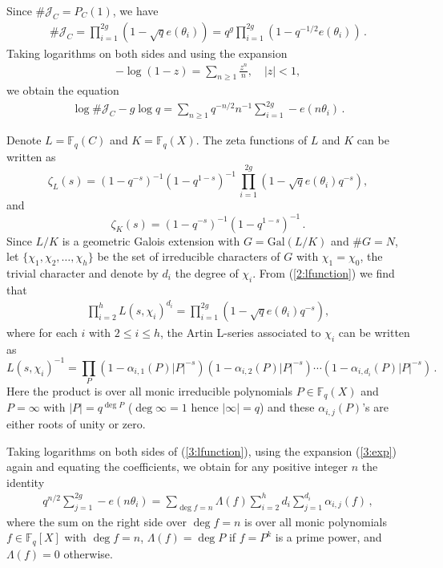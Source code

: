 \documentclass[12pt]{amsart}
\theoremstyle{plain}
\newcommand{\F}{{\mathbb F}_q}
\newcommand{\J}{\mathcal J}
\begin{document}
Since $\#\J_C=P_C(1)$, we have
\begin{eqnarray*}  \# \J_C=\prod_{i=1}^{2g} \left(1-\sqrt{q}e(\theta_i)\right) =q^g \prod_{i=1}^{2g} \left(1-q^{-1/2}e(\theta_i) \right)\,.\end{eqnarray*}
Taking logarithms on both sides and using the expansion
\begin{eqnarray} \label{3:exp}-\log (1-z)=\sum_{n \ge 1} \frac{z^n}{n}, \quad |z|<1,\end{eqnarray}
we obtain the equation
\begin{eqnarray} \label{3:log}
\log \#\J_C-g \log q =\sum_{n \ge 1} q^{-n/2}n^{-1} \sum_{i=1}^{2g} -e(n \theta_i)\,.
\end{eqnarray}

Denote $L=\F(C)$ and $K=\F(X)$. The zeta functions of $L$ and $K$ can be written as
\[\zeta_L(s) =(1-q^{-s})^{-1}(1-q^{1-s})^{-1} \, \prod_{i=1}^{2g} \left(1-\sqrt{q}e(\theta_i) q^{-s}\right), \]
and
\[\zeta_K(s)=(1-q^{-s})^{-1}(1-q^{1-s})^{-1}\,.\]
Since $L/K$ is a geometric Galois extension with $G=\mathrm{Gal}(L/K)$ and $\# G=N$, let $\{\chi_1,\chi_2,\ldots,\chi_h\}$ be the set of irreducible characters of $G$ with $\chi_1=\chi_0$, the trivial character and denote by $d_i$ the degree of $\chi_i$. From (\ref{2:lfunction}) we find that
\begin{eqnarray} \label{3:lfunction} \prod_{i=2}^h L(s,\chi_i)^{d_i}=\prod_{i=1}^{2g} \left(1-\sqrt{q}e(\theta_i) q^{-s}\right),\end{eqnarray}
where for each $i$ with $2 \le i \le h$, the Artin L-series associated to $\chi_i$ can be written as
\[L(s,\chi_i)^{-1}=\prod_{P} \left(1-\alpha_{i,1}(P)|P|^{-s}\right)\left(1-\alpha_{i,2}(P)|P|^{-s}\right) \cdots \left(1-\alpha_{i,d_i}(P)|P|^{-s}\right)\,. \]
Here the product is over all monic irreducible polynomials $P \in \F(X)$ and $P=\infty$ with $|P|=q^{\deg P}$ ($\deg \infty=1$ hence $|\infty|=q$) and these $\alpha_{i,j}(P)$'s are either roots of unity or zero.

Taking logarithms on both sides of (\ref{3:lfunction}), using the expansion (\ref{3:exp}) again and equating the coefficients, we obtain for any positive integer $n$ the identity
\begin{eqnarray} \label{3:id} q^{n/2} \sum_{j=1}^{2g}-e(n \theta_i)=\sum_{\deg f=n} \Lambda(f) \sum_{i=2}^h d_i\sum_{j=1}^{d_i}\alpha_{i,j}(f)\,, \end{eqnarray}
where the sum on the right side over $\deg f=n$ is over all monic polynomials $f \in \F[X]$ with $\deg f=n$, $\Lambda(f)=\deg P$ if $f=P^k$ is a prime power, and $\Lambda(f)=0$ otherwise.
\end{document}
